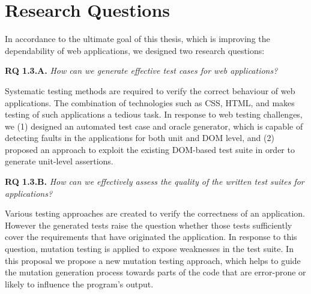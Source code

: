 \section{Research Questions} \label{Sec:researchq}
In accordance to the ultimate goal of this thesis, which is improving the dependability of \javascript web applications, we designed two research questions: 

{\bf RQ 1.3.A.} \emph{How can we generate effective test cases for \javascript web applications?}

Systematic testing methods are required to verify the correct behaviour of web applications. The combination of technologies such as CSS, HTML, and \javascript makes testing of such applications a tedious task.
In response to web testing challenges, we (1) designed an automated test case and oracle generator, which is capable of detecting faults
in the \javascript applications for both unit and DOM level, and (2) proposed an approach to exploit the existing DOM-based test suite in order to generate unit-level assertions. 

{\bf RQ 1.3.B.} \emph{How can we effectively assess the quality of the written test suites for \javascript applications?}

Various testing approaches are created to verify the correctness of an application. However the generated tests raise the question whether those tests sufficiently cover the requirements that have originated the application.  In response to this question, mutation testing is applied to expose weaknesses in the test suite.
In this proposal we propose a new \javascript mutation testing approach, which helps to guide the
mutation generation process towards parts of the code that are error-prone or likely to influence the program's
output.

